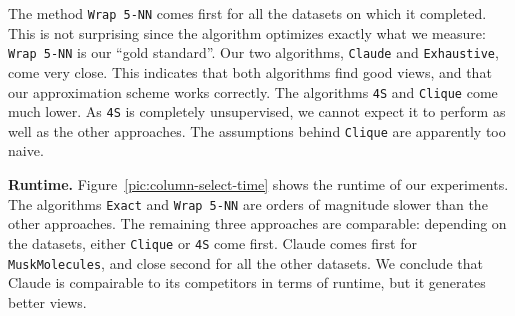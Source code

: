 The method \texttt{Wrap 5-NN} comes first for all the datasets on which it
completed. This is not surprising since the algorithm optimizes exactly what we
measure: \texttt{Wrap 5-NN} is our ``gold standard''. Our two algorithms,
\texttt{Claude} and \texttt{Exhaustive}, come very close. This indicates that
both algorithms find good views, and that our approximation scheme works
correctly.  The algorithms \texttt{4S} and \texttt{Clique} come much lower. As
\texttt{4S} is completely unsupervised, we cannot expect it to perform as well
as the other approaches. The assumptions behind \texttt{Clique} are
apparently too naive.

\textbf{Runtime.} Figure~\ref{pic:column-select-time} shows the runtime of our
experiments. The algorithms \texttt{Exact} and \texttt{Wrap 5-NN} are orders of
magnitude slower than the other approaches. The remaining three approaches are
comparable: depending on the datasets, either \texttt{Clique} or \texttt{4S}
come first. Claude comes first for \texttt{MuskMolecules}, and close
second for all the other datasets. We conclude that Claude is compairable to
its competitors in terms of runtime, but it generates better views.

